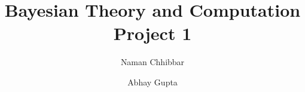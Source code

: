 \documentclass{beamer}
\title{Bayesian Theory and Computation\\Project 1}
\author[Naman Chhibbar \\ Abhay Gupta]{
  Naman Chhibbar \and
  Abhay Gupta
}
\institute{Indian Institute of Technology Hyderabad}
\begin{document}
  \begin{frame}
    \titlepage
  \end{frame}

  
  
  
  
  
\end{document}
